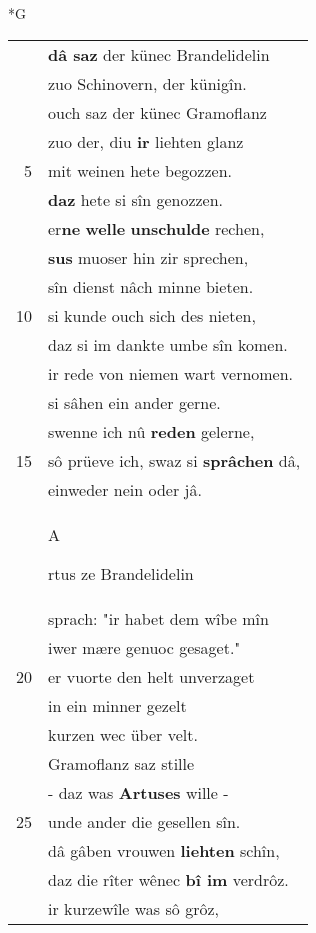 \documentclass[8pt,a4paper,notitlepage]{article}
\begin{document}
\begin{table}[ht]
\begin{minipage}[t]{0.5\linewidth}
\small
\begin{center}*G
\end{center}
\begin{tabular}{rl}
 & \textbf{dâ saz} der künec Brandelidelin\\ 
 & zuo Schinovern, der künigîn.\\ 
 & ouch saz der künec Gramoflanz\\ 
 & zuo der, diu \textbf{ir} liehten glanz\\ 
5 & mit weinen hete begozzen.\\ 
 & \textbf{daz} hete si sîn genozzen.\\ 
 & er\textbf{ne} \textbf{welle} \textbf{unschulde} rechen,\\ 
 & \textbf{sus} muoser hin zir sprechen,\\ 
 & sîn dienst nâch minne bieten.\\ 
10 & si kunde ouch sich des nieten,\\ 
 & daz si im dankte umbe sîn komen.\\ 
 & ir rede von niemen wart vernomen.\\ 
 & si sâhen ein ander gerne.\\ 
 & swenne ich nû \textbf{reden} gelerne,\\ 
15 & sô prüeve ich, swaz si \textbf{sprâchen} dâ,\\ 
 & einweder nein oder jâ.\\ 
 & \begin{large}A\end{large}rtus ze Brandelidelin\\ 
 & sprach: "ir habet dem wîbe mîn\\ 
 & iwer mære genuoc gesaget."\\ 
20 & er vuorte den helt unverzaget\\ 
 & in ein minner gezelt\\ 
 & kurzen wec über velt.\\ 
 & Gramoflanz saz stille\\ 
 & - daz was \textbf{Artuses} wille -\\ 
25 & unde ander die gesellen sîn.\\ 
 & dâ gâben vrouwen \textbf{liehten} schîn,\\ 
 & daz die rîter wênec \textbf{bî im} verdrôz.\\ 
 & ir kurzewîle was sô grôz,\\ 

\end{tabular}
\end{minipage}
\end{table}
\end{document}
